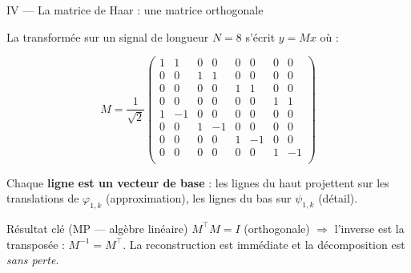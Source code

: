 \documentclass[10pt]{beamer}
\begin{document}
	\begin{frame}{IV — La matrice de Haar : une matrice orthogonale}
		
		La transformée sur un signal de longueur $N=8$ s'écrit $y = Mx$ où :
		
		\[
		M = \frac{1}{\sqrt{2}}
		\begin{pmatrix}
			1 & 1 & 0 & 0 & 0 & 0 & 0 & 0 \\
			0 & 0 & 1 & 1 & 0 & 0 & 0 & 0 \\
			0 & 0 & 0 & 0 & 1 & 1 & 0 & 0 \\
			0 & 0 & 0 & 0 & 0 & 0 & 1 & 1 \\
			1 &-1 & 0 & 0 & 0 & 0 & 0 & 0 \\
			0 & 0 & 1 &-1 & 0 & 0 & 0 & 0 \\
			0 & 0 & 0 & 0 & 1 &-1 & 0 & 0 \\
			0 & 0 & 0 & 0 & 0 & 0 & 1 &-1 \\
		\end{pmatrix}
		\]
		
		\medskip
		Chaque \textbf{ligne est un vecteur de base} : les lignes du haut projettent
		sur les translations de $\varphi_{1,k}$ (approximation), les lignes du bas
		sur $\psi_{1,k}$ (détail).
		
		\medskip
		\begin{alertblock}{Résultat clé (MP — algèbre linéaire)}
			$M^\top M = I$ (orthogonale) $\Rightarrow$ l'inverse est la transposée :
			$M^{-1} = M^\top$.
			La reconstruction est immédiate et la décomposition est \emph{sans perte}.
		\end{alertblock}
		
	\end{frame}
	
\end{document}
